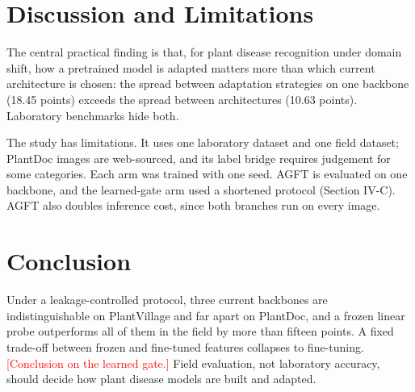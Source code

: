 \documentclass[conference]{IEEEtran}
\newcommand{\pending}[1]{\textcolor{red}{[#1]}}
\begin{document}
\section{Discussion and Limitations}
The central practical finding is that, for plant disease recognition under domain shift, how a pretrained model is adapted matters more than which current architecture is chosen: the spread between adaptation strategies on one backbone (18.45 points) exceeds the spread between architectures (10.63 points). Laboratory benchmarks hide both.

The study has limitations. It uses one laboratory dataset and one field dataset; PlantDoc images are web-sourced, and its label bridge requires judgement for some categories. Each arm was trained with one seed. AGFT is evaluated on one backbone, and the learned-gate arm used a shortened protocol (Section IV-C). AGFT also doubles inference cost, since both branches run on every image.

\section{Conclusion}
Under a leakage-controlled protocol, three current backbones are indistinguishable on PlantVillage and far apart on PlantDoc, and a frozen linear probe outperforms all of them in the field by more than fifteen points. A fixed trade-off between frozen and fine-tuned features collapses to fine-tuning. \pending{Conclusion on the learned gate.} Field evaluation, not laboratory accuracy, should decide how plant disease models are built and adapted.



\end{document}
